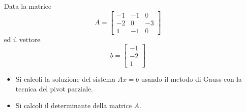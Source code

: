 Data la matrice
\bigskip
\[
A=\left[
\begin{array}{ccc}
-1 & -1 & 0 \\
-2 & 0 & -3\\
1 & -1 & 0
\end{array}\right]
\]
\noindent ed il vettore
\bigskip
\[
b=\left[
\begin{array}{ccc}
-1\\
-2 \\
1
\end{array}\right]
\]
\begin{itemize}
\item Si calcoli la soluzione del sistema $Ax=b$ usando il metodo
di Gauss con la tecnica del pivot parziale.
\item Si calcoli il determinante della matrice $A$.
\end{itemize}
